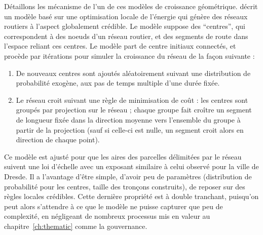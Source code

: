 \bpar{}
{
Détaillons les mécanisme de l'un de ces modèles de croissance géométrique. \cite{barthelemy2008modeling} décrit un modèle basé sur une optimisation locale de l'énergie qui génère des réseaux routiers à l'aspect globalement crédible. Le modèle suppose des ``centres'', qui correspondent à des noeuds d'un réseau routier, et des segments de route dans l'espace reliant ces centres. Le modèle part de centre initiaux connectés, et procède par itérations pour simuler la croissance du réseau de la façon suivante :
\begin{enumerate}
	\item De nouveaux centres sont ajoutés aléatoirement suivant une distribution de probabilité exogène, aux pas de temps multiple d'une durée fixée.
	\item Le réseau croit suivant une règle de minimisation de coût : les centres sont groupés par projection sur le réseau ; chaque groupe fait croître un segment de longueur fixée dans la direction moyenne vers l'ensemble du groupe à partir de la projection (sauf si celle-ci est nulle, un segment croit alors en direction de chaque point).
\end{enumerate}
Ce modèle est ajusté pour que les aires des parcelles délimitées par le réseau suivent une loi d'échelle avec un exposant similaire à celui observé pour la ville de Dresde. Il a l'avantage d'être simple, d'avoir peu de paramètres (distribution de probabilité pour les centres, taille des tronçons construits), de reposer sur des règles locales crédibles. Cette dernière propriété est à double tranchant, puisqu'on peut alors s'attendre à ce que le modèle ne puisse capturer que peu de complexité, en négligeant de nombreux processus mis en valeur au chapitre~\ref{ch:thematic} comme la gouvernance.
}











